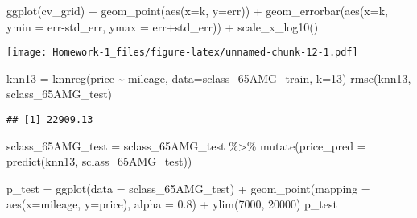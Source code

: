 \documentclass[
]{article}
\newenvironment{Shaded}{\begin{snugshade}}{\end{snugshade}}
\newcommand{\AttributeTok}[1]{\textcolor[rgb]{0.77,0.63,0.00}{#1}}
\newcommand{\DecValTok}[1]{\textcolor[rgb]{0.00,0.00,0.81}{#1}}
\newcommand{\FloatTok}[1]{\textcolor[rgb]{0.00,0.00,0.81}{#1}}
\newcommand{\FunctionTok}[1]{\textcolor[rgb]{0.00,0.00,0.00}{#1}}
\newcommand{\NormalTok}[1]{#1}
\newcommand{\OtherTok}[1]{\textcolor[rgb]{0.56,0.35,0.01}{#1}}
\newcommand{\SpecialCharTok}[1]{\textcolor[rgb]{0.00,0.00,0.00}{#1}}
\begin{document}
\begin{Shaded}
\begin{Highlighting}[]
\FunctionTok{ggplot}\NormalTok{(cv\_grid) }\SpecialCharTok{+} \FunctionTok{geom\_point}\NormalTok{(}\FunctionTok{aes}\NormalTok{(}\AttributeTok{x=}\NormalTok{k, }\AttributeTok{y=}\NormalTok{err)) }\SpecialCharTok{+} \FunctionTok{geom\_errorbar}\NormalTok{(}\FunctionTok{aes}\NormalTok{(}\AttributeTok{x=}\NormalTok{k, }\AttributeTok{ymin =}\NormalTok{ err}\SpecialCharTok{{-}}\NormalTok{std\_err, }\AttributeTok{ymax =}\NormalTok{ err}\SpecialCharTok{+}\NormalTok{std\_err)) }\SpecialCharTok{+} \FunctionTok{scale\_x\_log10}\NormalTok{()}
\end{Highlighting}
\end{Shaded}

\texttt{[image: Homework-1\_files/figure-latex/unnamed-chunk-12-1.pdf]}

\begin{Shaded}
\begin{Highlighting}[]
\NormalTok{knn13 }\OtherTok{=} \FunctionTok{knnreg}\NormalTok{(price }\SpecialCharTok{\textasciitilde{}}\NormalTok{ mileage, }\AttributeTok{data=}\NormalTok{sclass\_65AMG\_train, }\AttributeTok{k=}\DecValTok{13}\NormalTok{)}
\FunctionTok{rmse}\NormalTok{(knn13, sclass\_65AMG\_test)}
\end{Highlighting}
\end{Shaded}

\begin{verbatim}
## [1] 22909.13
\end{verbatim}

\begin{Shaded}
\begin{Highlighting}[]
\NormalTok{sclass\_65AMG\_test }\OtherTok{=}\NormalTok{ sclass\_65AMG\_test }\SpecialCharTok{\%\textgreater{}\%}
  \FunctionTok{mutate}\NormalTok{(}\AttributeTok{price\_pred =} \FunctionTok{predict}\NormalTok{(knn13, sclass\_65AMG\_test))}

\NormalTok{p\_test }\OtherTok{=} \FunctionTok{ggplot}\NormalTok{(}\AttributeTok{data =}\NormalTok{ sclass\_65AMG\_test) }\SpecialCharTok{+} \FunctionTok{geom\_point}\NormalTok{(}\AttributeTok{mapping =} \FunctionTok{aes}\NormalTok{(}\AttributeTok{x=}\NormalTok{mileage, }\AttributeTok{y=}\NormalTok{price), }\AttributeTok{alpha =} \FloatTok{0.8}\NormalTok{) }\SpecialCharTok{+} \FunctionTok{ylim}\NormalTok{(}\DecValTok{7000}\NormalTok{, }\DecValTok{20000}\NormalTok{)}
\NormalTok{p\_test}
\end{Highlighting}
\end{Shaded}
\end{document}
